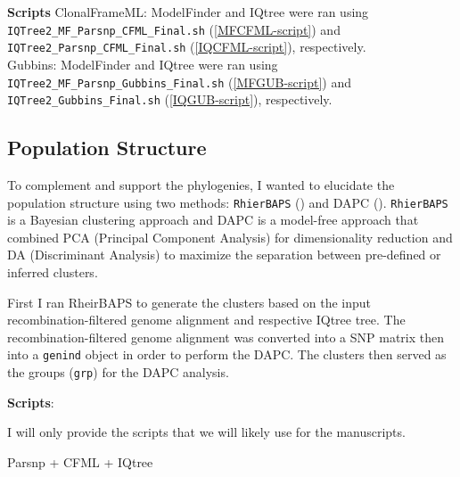 \documentclass[
]{book}
\begin{document}
\textbf{Scripts}
ClonalFrameML: ModelFinder and IQtree were ran using \texttt{IQTree2\_MF\_Parsnp\_CFML\_Final.sh} (\ref{MFCFML-script}) and \texttt{IQTree2\_Parsnp\_CFML\_Final.sh} (\ref{IQCFML-script}), respectively.\\
Gubbins: ModelFinder and IQtree were ran using \texttt{IQTree2\_MF\_Parsnp\_Gubbins\_Final.sh} (\ref{MFGUB-script}) and \texttt{IQTree2\_Gubbins\_Final.sh} (\ref{IQGUB-script}), respectively.

\subsection{Population Structure}\label{population-structure}

To complement and support the phylogenies, I wanted to elucidate the population structure using two methods: \texttt{RhierBAPS} (\citet{TonkinHill2018}) and DAPC (\citet{Jombart2008}). \texttt{RhierBAPS} is a Bayesian clustering approach and DAPC is a model-free approach that combined PCA (Principal Component Analysis) for dimensionality reduction and DA (Discriminant Analysis) to maximize the separation between pre-defined or inferred clusters.

First I ran RheirBAPS to generate the clusters based on the input recombination-filtered genome alignment and respective IQtree tree. The recombination-filtered genome alignment was converted into a SNP matrix then into a \texttt{genind} object in order to perform the DAPC. The clusters then served as the groups (\texttt{grp}) for the DAPC analysis.

\textbf{Scripts}:

I will only provide the scripts that we will likely use for the manuscripts.

Parsnp + CFML + IQtree
\end{document}
